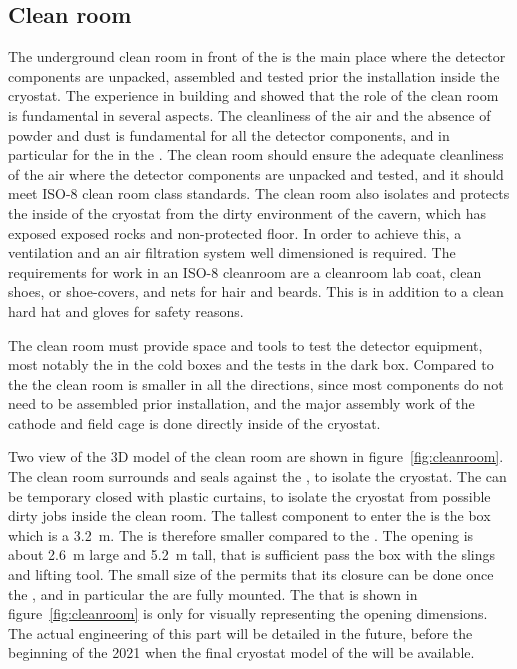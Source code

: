 \subsection{Clean room}
The underground clean room in front of the  is the main place where the detector components are unpacked, assembled and tested prior the installation inside the cryostat.
The experience in building  and  showed that the role of the clean room is fundamental in several aspects.
The cleanliness of the air and the absence of powder and dust is fundamental for all the detector components, and in particular for the  in the .
The clean room should ensure the adequate cleanliness of the air where the detector components are unpacked and tested, and it should meet ISO-8 clean room class standards.
The clean room also isolates and protects the inside of the cryostat from the dirty environment of the cavern, which has exposed exposed rocks and non-protected floor.
In order to achieve this, a ventilation and an air filtration system well dimensioned is required.
The requirements for work in an ISO-8 cleanroom are a cleanroom lab coat, clean shoes, or shoe-covers, and nets for hair and beards.
This is in addition to a clean hard hat and gloves for safety reasons.

The clean room must provide space and tools to test the detector equipment, most notably the  in the cold boxes and the  tests in the dark box.
Compared to the  the clean room is smaller in all the directions, since most components do not need to be assembled prior installation, and the major assembly work of the cathode and field cage is done directly inside of the cryostat.

Two view of the 3D model of the clean room are shown in figure~\ref{fig:cleanroom}.
The clean room surrounds and seals against the , to isolate the cryostat.
The  can be temporary closed with plastic curtains, to isolate the cryostat from possible dirty jobs inside the clean room.
The tallest component to enter the  is the  box which is a 3.2~m.
The  is therefore smaller compared to the .
The opening is about 2.6~m large and 5.2~m tall, that is sufficient pass the  box with the slings and lifting tool.
The small size of the  permits that its closure can be done once the , and in particular the  are fully mounted.
The  that is shown in figure~\ref{fig:cleanroom} is only for visually representing the opening dimensions.
The actual engineering of this part will be detailed in the future, before the beginning of the 2021 when the final cryostat model of the  will be available.

